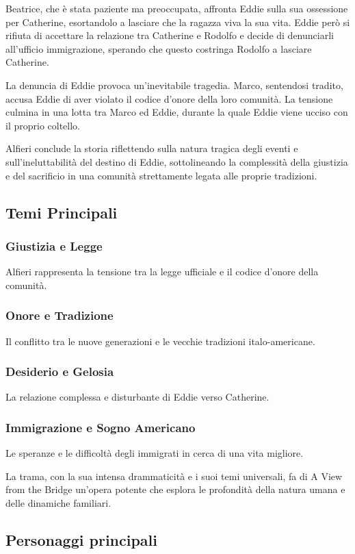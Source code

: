 \documentclass{article}
\begin{document}
Beatrice, che è stata paziente ma preoccupata, affronta Eddie sulla sua
ossessione per Catherine, esortandolo a lasciare che la ragazza viva la sua
vita. Eddie però si rifiuta di accettare la relazione tra Catherine e Rodolfo
e decide di denunciarli all'ufficio immigrazione, sperando che questo costringa
Rodolfo a lasciare Catherine.

La denuncia di Eddie provoca un'inevitabile tragedia. Marco, sentendosi
tradito, accusa Eddie di aver violato il codice d'onore della loro comunità.
La tensione culmina in una lotta tra Marco ed Eddie, durante la quale Eddie
viene ucciso con il proprio coltello.

Alfieri conclude la storia riflettendo sulla natura tragica degli eventi e
sull'ineluttabilità del destino di Eddie, sottolineando la complessità della
giustizia e del sacrificio in una comunità strettamente legata alle proprie
tradizioni.

\subsection{Temi Principali}

\subsubsection{Giustizia e Legge}
Alfieri rappresenta la tensione tra la legge ufficiale e il codice d'onore della
comunità.
\subsubsection{Onore e Tradizione}
Il conflitto tra le nuove generazioni e le vecchie tradizioni italo-americane.
\subsubsection{Desiderio e Gelosia}
La relazione complessa e disturbante di Eddie verso Catherine.
\subsubsection{Immigrazione e Sogno Americano}
Le speranze e le difficoltà degli immigrati in cerca di una vita migliore.

La trama, con la sua intensa drammaticità e i suoi temi universali,
fa di A View from the Bridge un'opera potente che esplora le profondità
della natura umana e delle dinamiche familiari.

\subsection{Personaggi principali}
\end{document}
